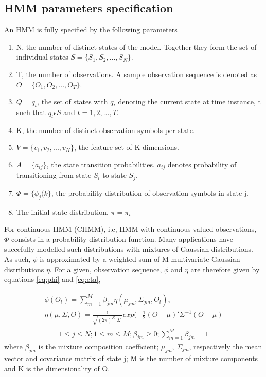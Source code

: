 \subsection{HMM parameters specification}
An HMM is fully specified by the following parameters 
\begin{enumerate}
	\item N, the number of distinct states of the model. Together they form the set of individual states \(S = \{S_1, S_2, ..., S_N\}\).
	\item T, the number of observations. A sample observation sequence is denoted as \(O = \{O_1, O_2, ..., O_T\}\).
	\item \(Q = {q_t}\), the set of states with \(q_t\) denoting the current state at time instance, t such that \(q_t \epsilon S\) and \(t = 1, 2, ..., T\).
	\item K, the number of distinct observation symbols per state. 
	\item \(V = \{v_1, v_2, ..., v_K\}\), the feature set of K dimensions.
	\item \(A =  \{a_{ij} \}\), the state transition probabilities. \(a_{ij}\)  denotes probability of transitioning from state \(S_i\) to state \(S_j\).
	\item \(\Phi =   \{ \phi_{j}(k\}\), the probability distribution of observation symbols in state j.
	\item The initial state distribution, \(\pi = {\pi_i}\)
\end{enumerate}
For continuous HMM (CHMM), i.e, HMM with continuous-valued observations, \(\Phi\) consists in a probability distribution function. Many applications have succefully modelled such distributions with mixtures of Gaussian distributions. %
As such, \(\phi\) is approximated by a weighted sum of M multivariate Gaussian distributions \(\eta\). For a given, observation sequence, \(\phi\)  and \(\eta\) are therefore given by equations \ref{eq:phi} and \ref{eq:eta},

\begin{align} 
	\phi(O_t) = \sum_{m=1}^M \beta_{jm} \eta(\mu_{jm}, \Sigma_{jm}, O_t), \label{eq:phi} \\
	\eta(\mu, \Sigma, O) = \frac{1}{\sqrt{(2\pi)^K|\Sigma|}}exp(-\frac{1}{2}(O-\mu)'\Sigma^{-1}(O-\mu) \label{eq:eta}
\end{align} 
\begin{align*}
	1 \leq j \leq N; 1 \leq m  \leq M; \beta_{jm} \geq 0; \sum_{m=1}^{M}\beta_{jm} = 1
\end{align*}
where \(\beta_{jm}\) is the mixture composition coefficient; \(\mu_{jm}\), \(\Sigma_{jm}\), respectively the mean vector and covariance matrix of state j; M is the number of mixture components and K is the dimensionality of O.

